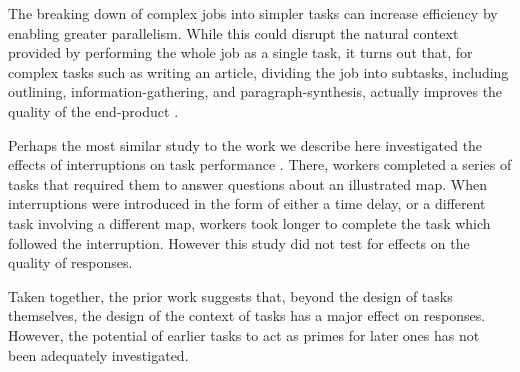 \documentclass{sigchi}
\begin{document}
The breaking down of complex jobs into simpler tasks can increase
efficiency by enabling greater parallelism.
While this could disrupt the natural context provided by performing the
whole job as a single task, it turns out that, 
for complex tasks such as writing an article, 
dividing the job into subtasks, including outlining, 
information-gathering, and paragraph-synthesis, actually improves the
quality of the end-product \cite{kittur2011crowdforge}.

Perhaps the most similar study to the work we describe here 
investigated the effects of interruptions on task performance
\cite{laseckieffects}.  There, workers 
completed a series of tasks that required them to answer questions about
an illustrated map.  When interruptions were introduced
in the form of either a time delay, or a different task involving a
different map, workers took longer to complete the task which 
followed the interruption.  However this study did not test for
effects on the quality of responses.

Taken together, the prior work suggests that, beyond the design
of tasks themselves, the design of the context of tasks has a major
effect on responses.
However, the potential of earlier tasks to act as primes for later ones 
has not been adequately investigated.
\end{document}
